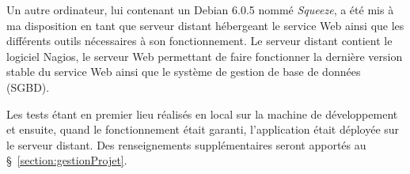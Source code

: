 Un autre ordinateur, lui contenant un Debian 6.0.5 nomm\'e \textit{Squeeze}, a \'et\'e mis \`a ma disposition en tant que serveur distant h\'ebergeant le service Web ainsi que les diff\'erents outils n\'ecessaires \`a son fonctionnement.
Le serveur distant contient le logiciel Nagios, le serveur Web permettant de faire fonctionner la derni\`ere version stable du service Web ainsi que le syst\`eme de gestion de base de donn\'ees (SGBD).

Les tests \'etant en premier lieu r\'ealis\'es en local sur la machine de d\'eveloppement et ensuite, quand le fonctionnement \'etait garanti, l'application \'etait d\'eploy\'ee sur le serveur distant.
Des renseignements suppl\'ementaires seront apport\'es au \S~\ref{section:gestionProjet}.



\clearpage
